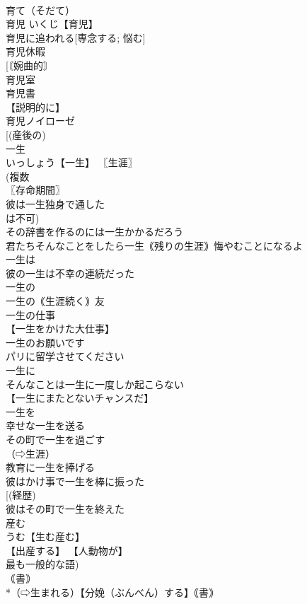 \documentclass[8pt]{extreport}
\begin{document}
\begin{CJK}{UTF8}{min}
\\	育て（そだて）
\\	育児		いくじ【育児】 
\\	育児に追われる[専念する; 悩む] 
\\	育児休暇 
\\	[〘婉曲的〙 
\\	育児室 
\\	育児書 
\\	【説明的に】
\\	育児ノイローゼ 
\\	[(産後の) 
\\	一生		
\\	いっしょう【一生】 〖生涯〗
\\	(複数 
\\	〖存命期間〗
\\	彼は一生独身で通した 
\\	は不可) 
\\	その辞書を作るのには一生かかるだろう 
\\	君たちそんなことをしたら一生｟残りの生涯｠悔やむことになるよ 
\\	一生は 
\\	彼の一生は不幸の連続だった 
\\	一生の 
\\	一生の｟生涯続く｠友 
\\	一生の仕事 
\\	【一生をかけた大仕事】
\\	一生のお願いです
\\	パリに留学させてください 
\\	一生に 
\\	そんなことは一生に一度しか起こらない 
\\	【一生にまたとないチャンスだ】
\\	一生を 
\\	幸せな一生を送る 
\\	その町で一生を過ごす 
\\	（⇨生涯） 
\\	教育に一生を捧げる 
\\	彼はかけ事で一生を棒に振った 
\\	[(経歴) 
\\	彼はその町で一生を終えた 
\\	産む		
\\	うむ【生む産む】 
\\	【出産する】 【人動物が】
\\	最も一般的な語) 
\\	｟書｠ 
\\	*（⇨生まれる）【分娩（ぶんべん）する】｟書｠

\end{CJK}
\end{document}
